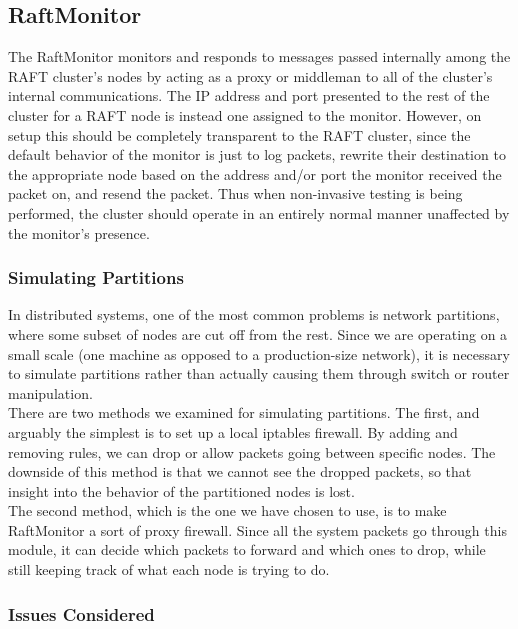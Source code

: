 \documentclass[UTF8]{article}
\begin{document}
\subsection{RaftMonitor}

The RaftMonitor monitors and responds to messages passed internally among the RAFT cluster's nodes by acting as a proxy or middleman to all of the cluster's internal communications. The IP address and port presented to the rest of the cluster for a RAFT node is instead one assigned to the monitor. However, on setup this should be completely transparent to the RAFT cluster, since the default behavior of the monitor is just to log packets, rewrite their destination to the appropriate node based on the address and/or port the monitor received the packet on, and resend the packet. Thus when non-invasive testing is being performed, the cluster should operate in an entirely normal manner unaffected by the monitor's presence.


\subsubsection{Simulating Partitions}

In distributed systems, one of the most common problems is network partitions, where some subset of nodes are cut off from the rest. Since we are operating on a small scale (one machine as opposed to a production-size network), it is necessary to simulate partitions rather than actually causing them through switch or router manipulation.
\\ \indent There are two methods we examined for simulating partitions. The first, and arguably the simplest is to set up a local iptables firewall. By adding and removing rules, we can drop or allow packets going between specific nodes. The downside of this method is that we cannot see the dropped packets, so that insight into the behavior of the partitioned nodes is lost.
\\ \indent The second method, which is the one we have chosen to use, is to make RaftMonitor a sort of proxy firewall. Since all the system packets go through this module, it can decide which packets to forward and which ones to drop, while still keeping track of what each node is trying to do.

\subsubsection{Issues Considered}
\end{document}

